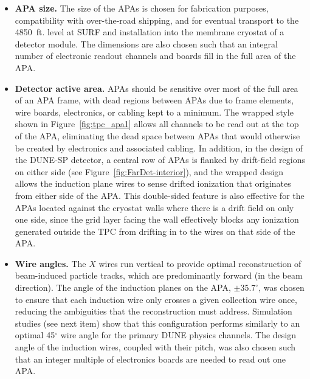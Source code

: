 \begin{itemize}

\item \textbf{APA size.} The size of the APAs is chosen for fabrication purposes, compatibility with over-the-road shipping, and for eventual transport to the \SI{4850}{ft}. level at SURF and installation into the membrane cryostat of a detector module. The dimensions are also chosen such that an integral number of electronic readout channels and boards fill in the full area of the APA. 

\item \textbf{Detector active area.} APAs should be sensitive over most of the full area of an APA frame, with dead regions between APAs due to frame elements, wire boards, electronics, or cabling kept to a minimum.  The wrapped style shown in Figure~\ref{fig:tpc_apa1} allows all channels to be read out at the top of the APA, eliminating the dead space between APAs that would otherwise be created by electronics and associated cabling. In addition, in the design of the DUNE-SP detector, a central row of APAs is flanked by drift-field regions on either side (see Figure~\ref{fig:FarDet-interior}), and the wrapped design allows the induction plane wires to sense drifted ionization that originates from either side of the APA.  This double-sided feature is also effective for the APAs located against the cryostat walls where there is a drift field on only one side, since the grid layer facing the wall effectively blocks any ionization generated outside the TPC from drifting in to the wires on that side of the APA.     

\item \textbf{Wire angles.} The $X$ wires run vertical to provide optimal reconstruction of beam-induced particle tracks, which are predominantly forward (in the beam direction). The angle of the induction planes on the APA, $\pm35.7^{\circ}$, was chosen to ensure that each induction wire only crosses a given collection wire once, reducing the ambiguities that the reconstruction must address.  Simulation studies (see next item) show that this configuration performs similarly to an optimal 45$^\circ$ wire angle for the primary DUNE physics channels.  The design angle of the induction wires, coupled with their pitch, was also chosen such that an integer multiple of electronics boards are needed to read out one APA.


\end{itemize}
